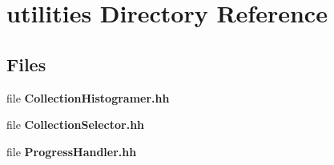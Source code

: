 \section{utilities Directory Reference}
\label{dir_ae9ce5df8a9b717d5c1384075451419f}
\subsection*{Files}
\begin{DoxyCompactItemize}
\item 
file {\bfseries Collection\-Histogramer.\-hh}
\item 
file {\bfseries Collection\-Selector.\-hh}
\item 
file {\bfseries Progress\-Handler.\-hh}
\end{DoxyCompactItemize}
